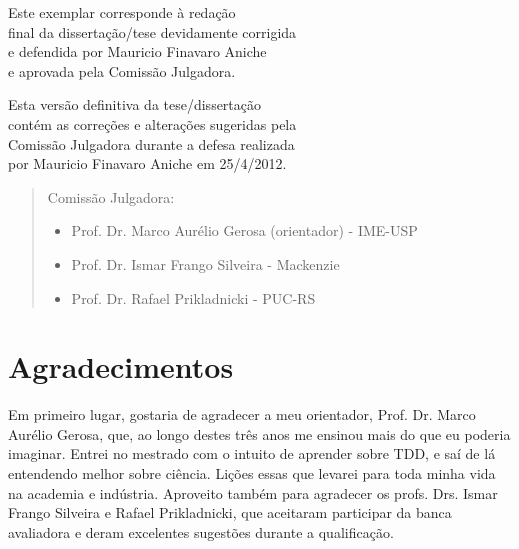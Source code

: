 \documentclass[11pt,openany,twoside,a4paper]{book}
\begin{document}
    \vskip 2cm

    \begin{flushright}
     Este exemplar corresponde à redação\\
     final da dissertação/tese devidamente corrigida\\
     e defendida por Mauricio Finavaro Aniche\\
     e aprovada pela Comissão Julgadora.
    
	Esta versão definitiva da tese/dissertação\\
	contém as correções e alterações sugeridas pela\\
	Comissão Julgadora durante a defesa realizada\\
    por Mauricio Finavaro Aniche em 25/4/2012.

    \vskip 2cm

    \end{flushright}
    \vskip 4.2cm

    \begin{quote}
    \noindent Comissão Julgadora:
    
    \begin{itemize}
		\item Prof. Dr. Marco Aurélio Gerosa (orientador) - IME-USP
		\item Prof. Dr. Ismar Frango Silveira - Mackenzie
		\item Prof. Dr. Rafael Prikladnicki - PUC-RS
    \end{itemize}
      
    \end{quote}
\pagebreak


\chapter*{Agradecimentos}

Em primeiro lugar, gostaria de agradecer a meu orientador, Prof. Dr. Marco Aurélio
Gerosa, que, ao longo destes três anos me ensinou mais do que eu poderia imaginar.
Entrei no mestrado com o intuito de aprender sobre TDD, e saí de lá entendendo
melhor sobre ciência. Lições essas que levarei para toda minha vida na academia e indústria.
Aproveito também para agradecer os profs. Drs. Ismar Frango Silveira e Rafael
Prikladnicki, que aceitaram participar da banca avaliadora
e deram excelentes sugestões durante a qualificação.
\end{document}
